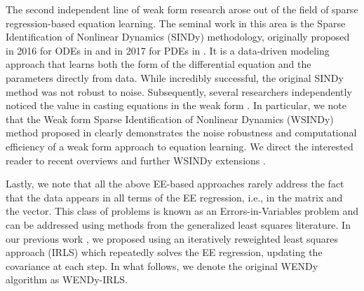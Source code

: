 The second independent line of weak form research arose out of the field of sparse regression-based equation learning. The seminal work in this area is the Sparse Identification of Nonlinear Dynamics (SINDy) methodology, originally proposed in 2016 for ODEs in \citep{BruntonProctorKutz2016ProcNatlAcadSci} and in 2017 for PDEs in \citep{RudyBruntonProctorEtAl2017SciAdv,Schaeffer2017ProcRSocMathPhysEngSci}. It is a data-driven modeling approach that learns both the form of the differential equation and the parameters directly from data. While incredibly successful, the original SINDy method was not robust to noise. Subsequently, several researchers independently noticed the value in casting equations in the weak form \citep{GurevichReinboldGrigoriev2019Chaos,MessengerBortz2021JComputPhys,MessengerBortz2021MultiscaleModelSimul,PantazisTsamardinos2019Bioinformatics,WangHuanGarikipati2019ComputMethodsApplMechEng}. In particular, we note that the Weak form Sparse Identification of Nonlinear Dynamics (WSINDy) method proposed in  \citep{MessengerBortz2021JComputPhys,MessengerBortz2021MultiscaleModelSimul} clearly demonstrates the noise robustness and computational efficiency of a weak form approach to equation learning. We direct the interested reader to recent overviews \cite{BortzMessengerTran2024NumericalAnalysisMeetsMachineLearning,MessengerTranDukicEtAl2024SIAMNews} and further WSINDy extensions \cite{MessengerBortz2022PhysicaD,MessengerBurbyBortz2024SciRep,MessengerDallAneseBortz2022ProcThirdMathSciMachLearnConf,MessengerWheelerLiuEtAl2022JRSocInterface,RussoMessengerBortzEtAl2024IFAC-PapersOnLine,TranHeMessengerEtAl2024ComputMethodsApplMechEng}.

Lastly, we note that all the above EE-based approaches rarely address the fact that the data appears in all terms of the EE regression, i.e., in the matrix and the vector.  This class of problems is known as an Errors-in-Variables problem \citep{Durbin1954RevIntStatInst} and can be addressed using methods from the generalized least squares literature. In our previous work \citep{BortzMessengerDukic2023BullMathBiol}, we proposed using an iteratively reweighted least squares approach (IRLS) which repeatedly solves the EE regression, updating the covariance at each step. In what follows, we denote the original WENDy algorithm as WENDy-IRLS.

